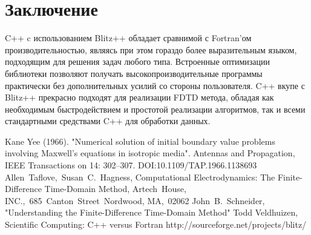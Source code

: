 \documentclass[10pt]{article}
\begin{document}
\section{Заключение}
C++ c использованием Blitz++ обладает сравнимой с Fortran'ом производительностью,
являясь при этом гораздо более выразительным языком, подходящим
для решения задач любого типа. Встроенные оптимизации библиотеки позволяют
получать высокопроизводительные программы практически без дополнительных
усилий со стороны пользователя. C++ вкупе с Blitz++ прекрасно подходят 
для реализации FDTD метода, обладая как необходимым быстродействием и 
простотой реализации алгоритмов, так и всеми стандартными средствами C++ 
для обработки данных.
\renewcommand{\refname}{Список Литературы}
\begin{thebibliography}{10}
  Kane Yee (1966). "Numerical solution of initial boundary value problems
  involving Maxwell's equations in isotropic media". Antennas and Propagation,
  IEEE Transactions on 14: 302–307. DOI:10.1109/TAP.1966.1138693
  Allen~Taflove,~Susan~C.~Hagness, Computational Electrodynamics: The Finite-
  Difference Time-Domain Method, Artech~House, INC.,~685~Canton~Street~Nordwood,
  MA,~02062
  John~B.~Schneider, "Understanding the Finite-Difference Time-Domain Method"
  Todd Veldhuizen, Scientific Computing: C++ versus Fortran
  http://sourceforge.net/projects/blitz/
\end{thebibliography}
\end{document}
